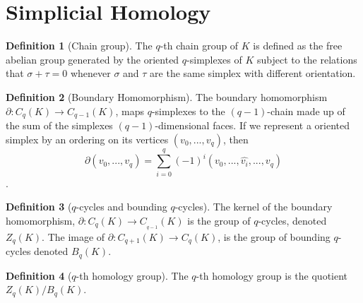 \documentclass{article}
\theoremstyle{definition}
\newtheorem{definition}{Definition}[section]
\theoremstyle{remark}
\theoremstyle{remark}
\begin{document}
\section{Simplicial Homology}

\begin{definition}[Chain group]
    The $q$-th chain group of $K$ is defined as the free abelian group generated by the oriented $q$-simplexes of $K$ subject to the relations that $\sigma + \tau = 0$ whenever $\sigma$ and $\tau$ are the same simplex with different orientation.
\end{definition}

\begin{definition}[Boundary Homomorphism]
    The boundary homomorphism $\partial: C_q(K) \to C_{q-1}(K)$, maps $q$-simplexes to the $(q-1)$-chain made up of the sum of the simplexes $(q-1)$-dimensional faces.
    If we represent a oriented simplex by an ordering on its vertices $(v_0, ..., v_q)$, then 
    $$\partial (v_0, ..., v_q) = \sum_{i=0}^q (-1)^i (v_0, ..., \hat{v_i}, ..., v_q)$$.
\end{definition}

\begin{definition}[$q$-cycles and bounding $q$-cycles]
    The kernel of the boundary homomorphism, $\partial: C_q(K) \to C__{q-1}(K)$ is the group of $q$-cycles, denoted $Z_q(K)$.
    The image of $\partial: C_{q+1}(K) \to C_q(K)$, is the group of bounding $q$-cycles denoted $B_q(K)$.
\end{definition}

\begin{definition}[$q$-th homology group]
    The $q$-th homology group is the quotient $Z_q(K) / B_q(K)$.
\end{definition}
\end{document}
